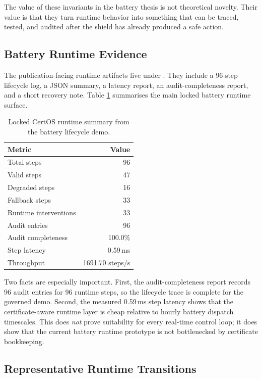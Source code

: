 The value of these invariants in the battery thesis is not theoretical
novelty.  Their value is that they turn runtime behavior into something
that can be traced, tested, and audited after the shield has already
produced a safe action.

\subsection{Battery Runtime Evidence}

The publication-facing runtime artifacts live under .
They include a 96-step lifecycle log, a JSON summary, a latency report, an
audit-completeness report, and a short recovery note.  Table
\ref{tab:certos-runtime-summary} summarises the main locked battery runtime
surface.

\begin{table}[ht]
\centering
\caption{Locked CertOS runtime summary from the battery lifecycle demo.}
\label{tab:certos-runtime-summary}
\begin{tabular}{lr}
\toprule
\textbf{Metric} & \textbf{Value} \\
\midrule
Total steps & 96 \\
Valid steps & 47 \\
Degraded steps & 16 \\
Fallback steps & 33 \\
Runtime interventions & 33 \\
Audit entries & 96 \\
Audit completeness & 100.0\% \\
Step latency & 0.59\,ms \\
Throughput & 1691.70 steps/s \\
\bottomrule
\end{tabular}
\end{table}

Two facts are especially important.  First, the audit-completeness report
records 96 audit entries for 96 runtime steps, so the lifecycle trace is
complete for the governed demo.  Second, the measured 0.59\,ms step latency
shows that the certificate-aware runtime layer is cheap relative to hourly
battery dispatch timescales.  This does \emph{not} prove suitability for
every real-time control loop; it does show that the current battery runtime
prototype is not bottlenecked by certificate bookkeeping.

\subsection{Representative Runtime Transitions}

